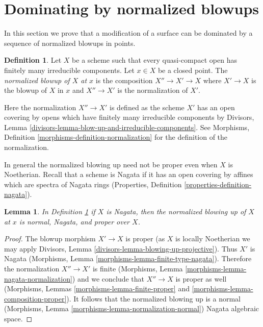 \documentclass{stacks-project}
\theoremstyle{plain}
\newtheorem{lemma}[subsection]{Lemma}
\theoremstyle{definition}
\newtheorem{definition}[subsection]{Definition}
\theoremstyle{remark}
\numberwithin{equation}{subsection}
\begin{document}
\section{Dominating by normalized blowups}
\label{section-normalized-blowups}

\noindent
In this section we prove that a modification of a surface can be dominated
by a sequence of normalized blowups in points.

\begin{definition}
\label{definition-normalized-blowup}
Let $X$ be a scheme such that every quasi-compact open has finitely
many irreducible components. Let $x \in X$ be a closed point.
The {\it normalized blowup of $X$ at $x$} is the composition
$X'' \to X' \to X$ where $X' \to X$ is the blowup
of $X$ in $x$ and $X'' \to X'$ is the normalization of $X'$.
\end{definition}

\noindent
Here the normalization $X'' \to X'$ is defined as the scheme $X'$
has an open covering by opens which have finitely many irreducible
components by
Divisors, Lemma \ref{divisors-lemma-blow-up-and-irreducible-components}.
See Morphisms, Definition \ref{morphisms-definition-normalization}
for the definition of the normalization.

\medskip\noindent
In general the normalized blowing up need not be proper even
when $X$ is Noetherian. Recall that a scheme is Nagata if it
has an open covering by affines which are spectra of Nagata rings
(Properties, Definition \ref{properties-definition-nagata}).

\begin{lemma}
\label{lemma-Nagata-normalized-blowup}
In Definition \ref{definition-normalized-blowup} if $X$ is Nagata,
then the normalized blowing up of $X$ at $x$ is
normal, Nagata, and proper over $X$.
\end{lemma}

\begin{proof}
The blowup morphism $X' \to X$ is proper
(as $X$ is locally Noetherian we may apply
Divisors, Lemma \ref{divisors-lemma-blowing-up-projective}).
Thus $X'$ is Nagata
(Morphisms, Lemma \ref{morphisms-lemma-finite-type-nagata}).
Therefore the normalization $X'' \to X'$ is finite
(Morphisms, Lemma \ref{morphisms-lemma-nagata-normalization})
and we conclude that $X'' \to X$ is proper as well
(Morphisms, Lemmas \ref{morphisms-lemma-finite-proper} and
\ref{morphisms-lemma-composition-proper}).
It follows that the normalized blowing up
is a normal (Morphisms, Lemma
\ref{morphisms-lemma-normalization-normal})
Nagata algebraic space.
\end{proof}
\end{document}
